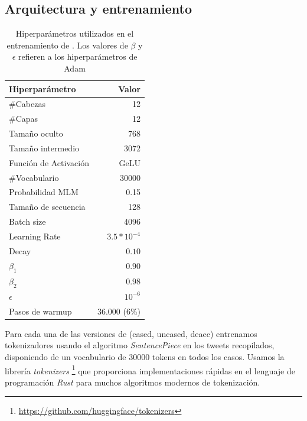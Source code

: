 \subsection{Arquitectura y entrenamiento}

\begin{table}[t]
    \centering
    \begin{tabular}{l r}
        \hline
        Hiperparámetro                  & Valor              \\
        \hline
        \#Cabezas                       & \num{12}           \\
        \#Capas                         & \num{12}           \\
        Tamaño oculto                   & \num{768}          \\
        Tamaño intermedio               & \num{3072}         \\
        Función de Activación           & GeLU               \\
        \#Vocabulario                   & \num{30000}        \\
        \hline
        \rule{0pt}{3ex}Probabilidad MLM & \num{0.15}         \\
        Tamaño de secuencia             & 128                \\
        Batch size                      & \num{4096}         \\
        Learning Rate                   & $3.5 * 10^{-4}$    \\
        Decay                           & $0.10$             \\
        $\beta_1$                       & $0.90$             \\
        $\beta_2$                       & $0.98$             \\
        $\epsilon$                      & $10^{-6}$          \\
        Pasos de warmup                 & \num{36,000} (6\%) \\
        \hline
    \end{tabular}
    \caption{Hiperparámetros utilizados en el entrenamiento de \robertuito{}. Los valores de $\beta$ y $\epsilon$ refieren a los hiperparámetros de Adam}
    \label{tab:robertuito_architecture}
\end{table}

Para cada una de las versiones de \robertuito{} (cased, uncased, deacc) entrenamos tokenizadores usando el algoritmo \emph{SentencePiece} \cite{kudo-richardson-2018-sentencepiece} en los tweets recopilados, disponiendo de un vocabulario de \num{30000} tokens en todos los casos. Usamos la librería \emph{tokenizers} \footnote{\url{https://github.com/huggingface/tokenizers}} que proporciona implementaciones rápidas en el lenguaje de programación \emph{Rust} para muchos algoritmos modernos de tokenización.

